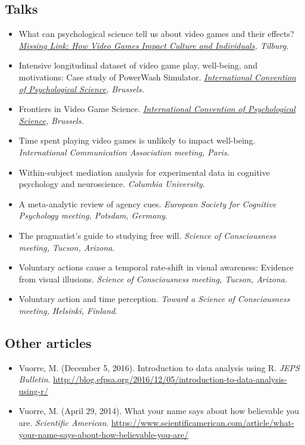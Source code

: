 \documentclass[12pt, a4paper]{article}
\newcommand{\years}[1]{\marginnote{\scriptsize #1}}
\begin{document}
\subsection*{Talks}
\begin{itemize}
  \item \years{2023} What can psychological science tell us about video games and their effects? \emph{\href{https://www.tilburguniversity.edu/campus/studium-generale/missing-link-impact-video-games}{Missing Link: How Video Games Impact Culture and Individuals}, Tilburg.}
  \item Intensive longitudinal dataset of video game play, well-being, and motivations: Case study of PowerWash Simulator. \emph{\href{https://www.psychologicalscience.org/conventions/icps-2023}{International Convention of Psychological Science}, Brussels.}
  \item Frontiers in Video Game Science. \emph{\href{https://www.psychologicalscience.org/conventions/icps-2023}{International Convention of Psychological Science}, Brussels.}
  \item \years{2022} Time spent playing video games is unlikely to impact well-being. \emph{International Communication Association meeting, Paris}.
  \item \years{2018} Within-subject mediation analysis for experimental data in cognitive psychology and neuroscience. \emph{Columbia University}.
  \item \years{2017} A meta-analytic review of agency cues. \emph{European Society for Cognitive Psychology meeting, Potsdam, Germany}.
  \item \years{2016} The pragmatist's guide to studying free will. \emph{Science of Consciousness meeting, Tucson, Arizona}.
  \item Voluntary actions cause a temporal rate-shift in visual awareness: Evidence from visual illusions. \emph{Science of Consciousness meeting, Tucson, Arizona}.
  \item \years{2015} Voluntary action and time perception. \emph{Toward a Science of Consciousness meeting, Helsinki, Finland}.
\end{itemize}

\subsection*{Other articles}
\begin{itemize}
  \item \years{2016} Vuorre, M. (December 5, 2016). Introduction to data analysis using R. \emph{JEPS Bulletin}. \url{http://blog.efpsa.org/2016/12/05/introduction-to-data-analysis-using-r/}
  \item \years{2014} Vuorre, M. (April 29, 2014). What your name says about how believable you are. \emph{Scientific American}. \url{https://www.scientificamerican.com/article/what-your-name-says-about-how-believable-you-are/}
\end{itemize}
\end{document}
